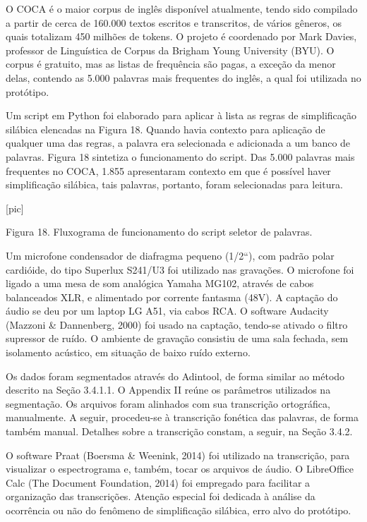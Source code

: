 O COCA \'e o maior corpus de ingl\^es dispon\'ivel atualmente, tendo sido
compilado a partir de cerca de 160.000 textos escritos e transcritos, de
v\'arios g\^eneros, os quais totalizam 450 milh\~oes de tokens. O projeto \'e
coordenado por Mark Davies, professor de Lingu\'istica de Corpus da
Brigham Young University (BYU). O corpus \'e gratuito, mas as listas de
frequ\^encia s\~ao pagas, a exce\c{c}\~ao da menor delas, contendo as 5.000
palavras mais frequentes do ingl\^es, a qual foi utilizada no prot\'otipo.

Um script em Python foi elaborado para aplicar à lista as regras de
simplifica\c{c}\~ao sil\'abica elencadas na Figura 18. Quando havia contexto
para aplica\c{c}\~ao de qualquer uma das regras, a palavra era selecionada e
adicionada a um banco de palavras. Figura 18 sintetiza o funcionamento
do script. Das 5.000 palavras mais frequentes no COCA, 1.855
apresentaram contexto em que \'e poss\'ivel haver simplifica\c{c}\~ao sil\'abica,
tais palavras, portanto, foram selecionadas para leitura.

                                [pic]

Figura 18. Fluxograma de funcionamento do script seletor de palavras.

Um microfone condensador de diafragma pequeno (1/2``), com padr\~ao polar
cardi\'oide, do tipo Superlux S241/U3 foi utilizado nas grava\c{c}\~oes. O
microfone foi ligado a uma mesa de som anal\'ogica Yamaha MG102, atrav\'es
de cabos balanceados XLR, e alimentado por corrente fantasma (48V). A
capta\c{c}\~ao do \'audio se deu por um laptop LG A51, via cabos RCA. O software
Audacity (Mazzoni \& Dannenberg, 2000) foi usado na capta\c{c}\~ao, tendo-se
ativado o filtro supressor de ru\'ido. O ambiente de grava\c{c}\~ao consistiu de
uma sala fechada, sem isolamento ac\'ustico, em situa\c{c}\~ao de baixo ru\'ido
externo.

Os dados foram segmentados atrav\'es do Adintool, de forma similar ao
m\'etodo descrito na Se\c{c}\~ao 3.4.1.1. O Appendix II re\'une os par\^ametros
utilizados na segmenta\c{c}\~ao. Os arquivos foram alinhados com sua
transcri\c{c}\~ao ortogr\'afica, manualmente. A seguir, procedeu-se à
transcri\c{c}\~ao fon\'etica das palavras, de forma tamb\'em manual. Detalhes
sobre a transcri\c{c}\~ao constam, a seguir, na Se\c{c}\~ao 3.4.2.

O software Praat (Boersma \& Weenink, 2014) foi utilizado na
transcri\c{c}\~ao, para visualizar o espectrograma e, tamb\'em, tocar os
arquivos de \'audio. O LibreOffice Calc (The Document Foundation, 2014)
foi empregado para facilitar a organiza\c{c}\~ao das transcri\c{c}\~oes. Aten\c{c}\~ao
especial foi dedicada à an\'alise da ocorr\^encia ou n\~ao do fen\^omeno de
simplifica\c{c}\~ao sil\'abica, erro alvo do prot\'otipo.

